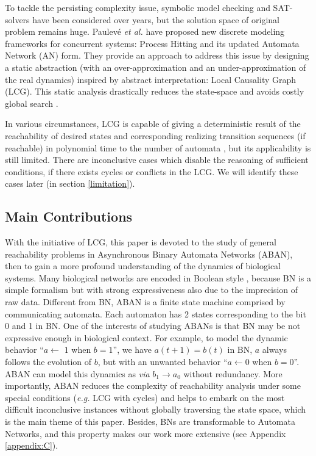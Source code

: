 \documentclass[runningheads]{llncs}
\newcommand{\ac}[3]{$#1\rightarrow#2$}
\begin{document}
To tackle the persisting complexity issue, symbolic model checking \cite{burch1992symbolic} and SAT-solvers \cite{abdulla2000symbolic} have been considered over years, but the solution space of original problem remains huge. Paulev\'e \textit{et al.} \cite{folschette2015,pauleve2011} have proposed new discrete modeling frameworks for concurrent systems: Process Hitting and its updated Automata Network (AN) form. They provide an approach to address this issue by designing a static abstraction (with an over-approximation and an under-approximation of the real dynamics) inspired by abstract interpretation: Local Causality Graph (LCG). This static analysis drastically reduces the state-space and avoids costly global search \cite{pauleve2012}.

In various circumstances, LCG is capable of giving a deterministic result of the reachability of desired states and corresponding realizing transition sequences (if reachable) in polynomial time to the number of automata \cite{pauleve2016goal}, but its applicability is still limited. There are inconclusive cases which disable the reasoning of sufficient conditions, if there exists cycles or conflicts in the LCG. We will identify these cases later (in section \ref{limitation}).
\subsection*{Main Contributions}
With the initiative of LCG, this paper is devoted to the study of general reachability problems in Asynchronous Binary Automata Networks (ABAN), then to gain a more profound understanding of the dynamics of biological systems. Many biological networks are encoded in Boolean style \cite{kauffman1969}, because BN is a simple formalism but with strong expressiveness also due to the imprecision of raw data. Different from BN, ABAN is a finite state machine comprised by communicating automata. Each automaton has 2 states corresponding to the bit 0 and 1 in BN. One of the interests of studying ABANs is that BN may be not expressive enough in biological context. For example, to model the dynamic behavior ``$a\gets$ $1$ when $b=1$'', we have $a(t+1)=b(t)$ in BN, $a$ always follows the evolution of $b$, but with an unwanted behavior ``$a\gets 0$ when $b=0$''. ABAN can model this dynamics as \textit{via} \ac{b_1}{a_0}{a_1} without redundancy. More importantly, ABAN reduces the complexity of reachability analysis under some special conditions (\textit{e.g.} LCG with cycles) and helps to embark on the most difficult inconclusive instances without globally traversing the state space, which is the main theme of this paper. Besides, BNs are transformable to Automata Networks, and this property makes our work more extensive (see Appendix \ref{appendix:C}).
\end{document}
